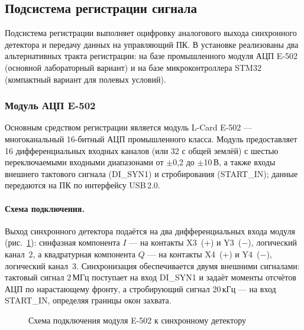 \subsection{Подсистема регистрации сигнала}

Подсистема регистрации выполняет оцифровку аналогового выхода синхронного
детектора и передачу данных на управляющий ПК. В установке реализованы два
альтернативных тракта регистрации: на базе промышленного модуля АЦП E-502
(основной лабораторный вариант) и на базе микроконтроллера STM32 (компактный
вариант для полевых условий).

\subsubsection{Модуль АЦП E-502}

Основным средством регистрации является модуль L-Card E-502 ---
многоканальный 16-битный АЦП промышленного класса. Модуль предоставляет
16 дифференциальных входных каналов (или 32 с общей землёй) с шестью
переключаемыми входными диапазонами от $\pm$0{,}2 до $\pm$10\,В, а также
входы внешнего тактового сигнала (DI\_SYN1) и стробирования (START\_IN);
данные передаются на ПК по интерфейсу USB\,2.0.

\paragraph{Схема подключения.}
Выход синхронного детектора подаётся на два дифференциальных входа модуля
(рис.~\ref{fig:e502-wiring}): синфазная компонента $I$ --- на контакты X3~(+)
и Y3~($-$), логический канал~2, а квадратурная компонента $Q$ --- на контакты
X4~(+) и Y4~($-$), логический канал~3. Синхронизация обеспечивается двумя
внешними сигналами: тактовый сигнал 2\,МГц поступает на вход DI\_SYN1 и
задаёт моменты отсчётов АЦП по нарастающему фронту, а стробирующий сигнал
20\,кГц --- на вход START\_IN, определяя границы окон захвата.

\begin{figure}[H]
    \centering
    \caption{Схема подключения модуля E-502 к синхронному детектору}
    \label{fig:e502-wiring}
\end{figure}

